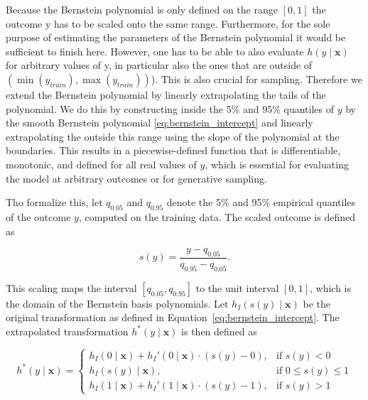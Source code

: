 Because the Bernstein polynomial is only defined on the range \( [0, 1] \) the outcome y has to be scaled onto the same range. Furthermore, for the sole purpose of estimating the parameters of the Bernstein polynomial it would be sufficient to finish here. However, one has to be able to also evaluate $h(y \mid \mathbf{x})$ for arbitrary values of y, in particular also the ones that are outside of $(\min(y_{train}), \max(y_{train}))$). This is also crucial for sampling. Therefore we extend the Bernstein polynomial by linearly extrapolating the tails of the polynomial. We do this by constructing inside the 5\% and 95\% quantiles of $y$ by the smooth Bernstein polynomial \ref{eq:bernstein_intercept} and linearly extrapolating the outside this range using the slope of the polynomial at the boundaries. This results in a piecewise-defined function that is differentiable, monotonic, and defined for all real values of \( y \), which is essential for evaluating the model at arbitrary outcomes or for generative sampling.

Tho formalize this, let \( q_{0.05} \) and \( q_{0.95} \) denote the 5\% and 95\% empirical quantiles of the outcome \( y \), computed on the training data. The scaled outcome is defined as

\begin{equation}
s(y) = \frac{y - q_{0.05}}{q_{0.95} - q_{0.05}}.
\end{equation}

This scaling maps the interval \( [q_{0.05}, q_{0.95}] \) to the unit interval \( [0, 1] \), which is the domain of the Bernstein basis polynomials. Let \( h_I(s(y) \mid \mathbf{x}) \) be the original transformation as defined in Equation~\eqref{eq:bernstein_intercept}. The extrapolated transformation \( h^*(y \mid \mathbf{x}) \) is then defined as

\begin{equation}
h^*(y \mid \mathbf{x}) =
\begin{cases}
h_I(0 \mid \mathbf{x}) + h_I'(0 \mid \mathbf{x}) \cdot (s(y) - 0), & \text{if } s(y) < 0 \\
h_I(s(y) \mid \mathbf{x}), & \text{if } 0 \leq s(y) \leq 1 \\
h_I(1 \mid \mathbf{x}) + h_I'(1 \mid \mathbf{x}) \cdot (s(y) - 1), & \text{if } s(y) > 1
\end{cases}
\label{eq:extended_bernstein}
\end{equation}

